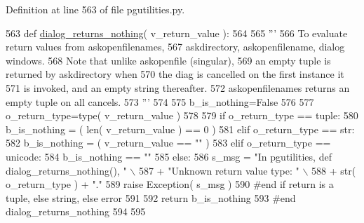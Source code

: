 Definition at line 563 of file pgutilities.\+py.


\begin{DoxyCode}
563 \textcolor{keyword}{def }\hyperlink{namespacenegui_1_1pgutilities_aa839d4997d2bd2c15016c33cc7fce3b0}{dialog\_returns\_nothing}( v\_return\_value ):
564 
565     \textcolor{stringliteral}{'''}
566 \textcolor{stringliteral}{    To evaluate return values from askopenfilenames,}
567 \textcolor{stringliteral}{    askdirectory, askopenfilename, dialog windows.}
568 \textcolor{stringliteral}{    Note that unlike askopenfile (singular),}
569 \textcolor{stringliteral}{    an empty tuple is returned by askdirectory when}
570 \textcolor{stringliteral}{    the diag is cancelled on the first instance it}
571 \textcolor{stringliteral}{    is invoked, and an empty string thereafter.  }
572 \textcolor{stringliteral}{    askopenfilenames returns an empty tuple on all cancels.}
573 \textcolor{stringliteral}{    '''} 
574 
575     b\_is\_nothing=\textcolor{keyword}{False}
576 
577     o\_return\_type=type( v\_return\_value )
578 
579     \textcolor{keywordflow}{if} o\_return\_type == tuple:
580         b\_is\_nothing = ( len( v\_return\_value ) == 0 )
581     \textcolor{keywordflow}{elif} o\_return\_type == str:
582         b\_is\_nothing = ( v\_return\_value == \textcolor{stringliteral}{""} )
583     \textcolor{keywordflow}{elif} o\_return\_type == unicode:
584         b\_is\_nothing == \textcolor{stringliteral}{""}
585     \textcolor{keywordflow}{else}:
586         s\_msg = \textcolor{stringliteral}{"In pgutilities, def dialog\_returns\_nothing(), "} \(\backslash\)
587                 + \textcolor{stringliteral}{"Unknown return value type: "} \(\backslash\)
588                 + str( o\_return\_type ) + \textcolor{stringliteral}{"."}
589         \textcolor{keywordflow}{raise} Exception( s\_msg )
590     \textcolor{comment}{#end if return is a tuple, else string, else error}
591 
592     \textcolor{keywordflow}{return} b\_is\_nothing 
593 \textcolor{comment}{#end dialog\_returns\_nothing}
594         
595 
\end{DoxyCode}
